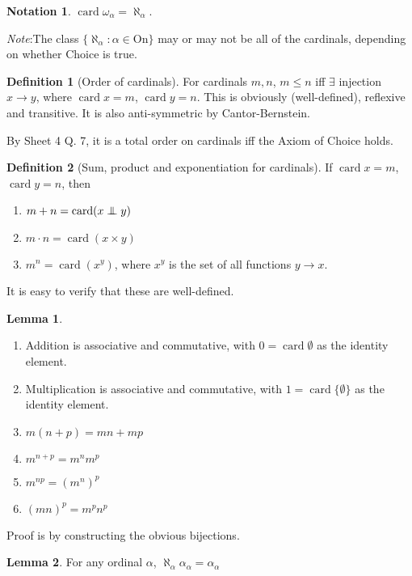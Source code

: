 \documentclass[a4paper]{article}
\theoremstyle{definition}
\newtheorem*{defi}{Definition}
\newtheorem*{lemma}{Lemma}
\newtheorem*{notation}{Notation}
\newcommand{\note}{\noindent \emph{Note}:\;}
\newcommand{\On}{\mathrm{On}}
\newcommand{\oadd}{\mathrel\bot\joinrel\mspace{-8mu}\mathrel\bot}
\DeclareMathOperator\card{card}
\begin{document}
\begin{notation}
  $\card \omega_\alpha = \aleph_\alpha$.
\end{notation}
\note The class $\{\aleph_\alpha: \alpha\in \On\}$ may or may not be all of the cardinals, depending on whether Choice is true.

\begin{defi}[Order of cardinals]
  For cardinals $m, n$, $m \leq n$ iff $\exists$ injection $x\to y$, where $\card x = m$, $\card y = n$. This is obviously (well-defined), reflexive and transitive. It is also anti-symmetric by Cantor-Bernstein.
\end{defi}

By Sheet 4 Q. 7, it is a total order on cardinals iff the Axiom of Choice holds.

\begin{defi}[Sum, product and exponentiation for cardinals]
  If $\card x = m$, $\card y = n$, then
  \begin{enumerate}
  \item $m + n = \card(x\oadd y)$
  \item $m\cdot n = \card (x\times y)$
  \item $m^n = \card (x^y)$, where $x^y$ is the set of all functions $y\to x$.
  \end{enumerate}
  It is easy to verify that these are well-defined.
\end{defi}

\begin{lemma}\leavevmode
  \begin{enumerate}
  \item Addition is associative and commutative, with $0 = \card\emptyset$ as the identity element.
  \item Multiplication is associative and commutative, with $1 = \card\{\emptyset\}$ as the identity element.
  \item $m(n + p) = mn + mp$
  \item $m^{n + p} = m^nm^p$
  \item $m^{np} = (m^n)^p$
  \item $(mn)^p = m^pn^p$
  \end{enumerate}
  Proof is by constructing the obvious bijections. 
\end{lemma}

\begin{lemma}
  For any ordinal $\alpha$, $\aleph_\alpha\alpha_\alpha = \alpha_\alpha$
\end{lemma}
\end{document}

